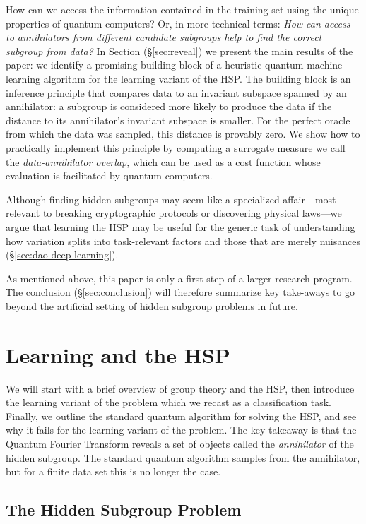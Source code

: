 \documentclass[aps, pre,reprint,nofootinbib,citeautoscript,floatfix]{revtex4-1}
\begin{document}
How can we access the information contained in the training set using the unique properties of quantum computers? Or, in more technical terms: \textit{How can access to annihilators from different candidate subgroups help to find the correct subgroup from data?} In Section (\S\ref{sec:reveal}) we present the main results of the paper: we identify a promising building block of a heuristic quantum machine learning algorithm for the learning variant of the HSP. The building block is an inference principle that compares data to an invariant subspace spanned by an annihilator: a subgroup is considered more likely to produce the data if the distance to its annihilator's invariant subspace is smaller. For the perfect oracle from which the data was sampled, this distance is provably zero. 
We show how to practically implement this principle by computing a surrogate measure we call the \textit{data-annihilator overlap}, which can be used as a cost function whose evaluation is facilitated by quantum computers.

Although finding hidden 
subgroups may seem like a specialized affair---most relevant to breaking cryptographic protocols or discovering physical laws---we argue that learning the HSP may be useful for the generic task of understanding how variation splits into task-relevant factors and those that are merely nuisances
(\S\ref{sec:dao-deep-learning}).  

As mentioned above, this paper is only a first step of a larger research program. The conclusion (\S\ref{sec:conclusion}) will therefore summarize key take-aways to go beyond the artificial setting of hidden subgroup problems in future.

\section{Learning and the HSP}
\label{sec:hsp-clustering}

We will start with a brief overview of group theory and the HSP, then introduce the learning variant of the problem which we recast as a classification task. Finally, we outline the standard quantum algorithm for solving the HSP, and see why it fails for the learning variant of the problem.
The key takeaway is that the Quantum Fourier Transform reveals a set of objects called the \textit{annihilator} of the hidden subgroup. The standard quantum algorithm samples from the annihilator, but for a finite data set this is no longer the case.

\subsection{The Hidden Subgroup Problem}
\end{document}
